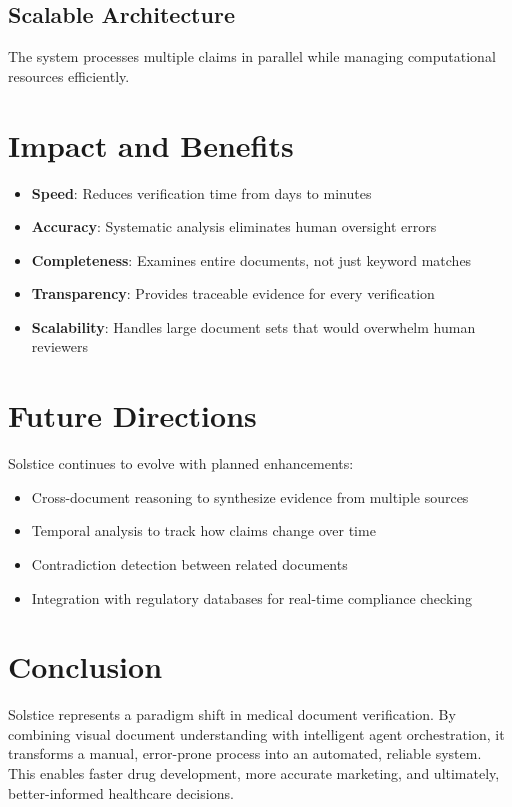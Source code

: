\documentclass[11pt]{article}
\begin{document}
\subsection{Scalable Architecture}
The system processes multiple claims in parallel while managing computational resources efficiently.

\section{Impact and Benefits}

\begin{itemize}
\item \textbf{Speed}: Reduces verification time from days to minutes
\item \textbf{Accuracy}: Systematic analysis eliminates human oversight errors
\item \textbf{Completeness}: Examines entire documents, not just keyword matches
\item \textbf{Transparency}: Provides traceable evidence for every verification
\item \textbf{Scalability}: Handles large document sets that would overwhelm human reviewers
\end{itemize}

\section{Future Directions}

Solstice continues to evolve with planned enhancements:
\begin{itemize}
\item Cross-document reasoning to synthesize evidence from multiple sources
\item Temporal analysis to track how claims change over time
\item Contradiction detection between related documents
\item Integration with regulatory databases for real-time compliance checking
\end{itemize}

\section{Conclusion}

Solstice represents a paradigm shift in medical document verification. By combining visual document understanding with intelligent agent orchestration, it transforms a manual, error-prone process into an automated, reliable system. This enables faster drug development, more accurate marketing, and ultimately, better-informed healthcare decisions.
\end{document}
